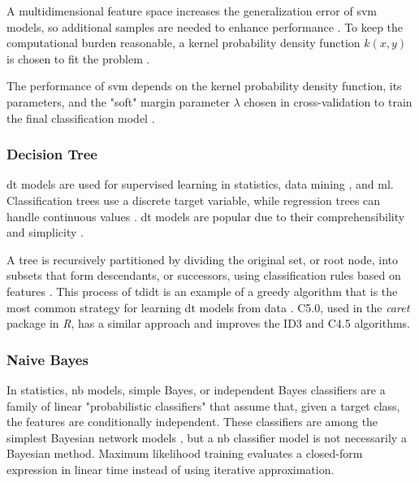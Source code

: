 \documentclass[sn-mathphys-num]{sn-jnl}%
\begin{document}
A multidimensional feature space increases the generalization error of \acrshort{svm} models, so additional samples are needed to enhance performance \cite{Jin2012}. To keep the computational burden reasonable, a kernel probability density function $k(x, y)$ is chosen to fit the problem \cite{Press2007}.

The performance of \acrshort{svm} depends on the kernel probability density function, its parameters, and the "soft" margin parameter $\lambda$ chosen in cross-validation to train the final classification model \cite{Hsu2003}.

\subsubsection{Decision Tree}

\acrfull{dt} models are used for supervised learning in statistics, data mining \cite{Rokach2014}, and \acrlong{ml}. Classification trees use a discrete target variable, while regression trees can handle continuous values \cite{Studer2011}. \acrshort{dt} models are popular due to their comprehensibility and simplicity \cite{Wu2008}.

A tree is recursively partitioned by dividing the original set, or root node, into subsets that form descendants, or successors, using classification rules based on features \cite{ShalevShwartz2014}. This process of \acrfull{tdidt} \cite{Quinlan1986} is an example of a greedy algorithm that is the most common strategy for learning \acrshort{dt} models from data \cite{Rokach2005}. C5.0, used in the \textit{caret} package in \textit{R}, has a similar approach and improves the ID3 and C4.5 algorithms.

\subsubsection{Naive Bayes}

In statistics, \acrfull{nb} models, simple Bayes, or independent Bayes \cite{Hand2001} classifiers are a family of linear "probabilistic classifiers" that assume that, given a target class, the features are conditionally independent. These classifiers are among the simplest Bayesian network models \cite{McCallum2011}, but a \acrshort{nb} classifier model is not necessarily a Bayesian method. Maximum likelihood training evaluates a closed-form expression \cite{Russell1999} in linear time instead of using iterative approximation.
\end{document}
